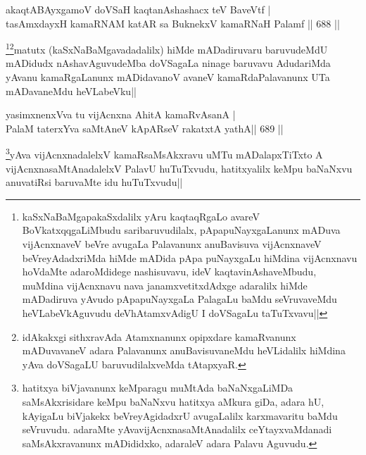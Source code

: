 
\begin{shl}
akaqtABAyxgamoV doVSaH kaqtanAshashacx teV BaveVtf | \\
tasAmxdayxH kamaRNAM katAR sa BuknekxV kamaRNaH Palamf \hfill||  688 ||  
\end{shl}

\begin{artha}
\footnote{kaSxNaBaMgapakaSxdalilx yAru kaqtaqRgaLo avareV BoVkatxqqgaLiMbudu saribaruvudilalx, pApapuNayxgaLanunx mADuva vijAcnxnaveV beVre avugaLa Palavanunx anuBavisuva vijAcnxnaveV beVreyAdadxriMda hiMde mADida pApa puNayxgaLu hiMdina vijAcnxnavu hoVdaMte adaroMdidege nashisuvavu, ideV kaqtavinAshaveMbudu, muMdina vijAcnxnavu nava janamxvetitxdAdxge adaralilx hiMde mADadiruva yAvudo pApapuNayxgaLa PalagaLu baMdu seVruvaveMdu heVLabeVkAguvudu deVhAtamxvAdigU I doVSagaLu taTuTxvavu||}\footnote{idAkakxgi sithxravAda Atamxnanunx opipxdare kamaRvanunx mADuvavaneV adara Palavanunx anuBavisuvaneMdu heVLidalilx hiMdina yAva doVSagaLU baruvudilalxveMda tAtapxyaR.}matutx (kaSxNaBaMgavadadalilx) hiMde mADadiruvaru baruvudeMdU mADidudx nAshavAguvudeMba doVSagaLa ninage baruvavu AdudariMda yAvanu kamaRgaLanunx mADidavanoV avaneV kamaRdaPalavanunx UTa mADavaneMdu heVLabeVku||
\end{artha}



\begin{shl}
yasimxnenxVva tu vijAcnxna AhitA kamaRvAsanA | \\
PalaM taterxYva saMtAneV kApARseV rakatxtA yathA\hfill ||  689 ||  
\end{shl}

\begin{artha}
\footnote{hatitxya biVjavanunx keMparagu muMtAda baNaNxgaLiMDa saMsAkxrisidare keMpu baNaNxvu  hatitxya aMkura giDa, adara hU, kAyigaLu biVjakekx beVreyAgidadxrU avugaLalilx karxmavaritu baMdu seVruvudu. adaraMte yAvavijAcnxnasaMtAnadalilx ceYtayxvaMdanadi saMsAkxravanunx mADididxko, adaraleV adara Palavu Aguvudu.}yAva vijAcnxnadalelxV kamaRsaMsAkxravu uMTu mADalapxTiTxto A vijAcnxnasaMtAnadalelxV PalavU huTuTxvudu, hatitxyalilx keMpu baNaNxvu anuvatiRsi baruvaMte idu huTuTxvudu||
\end{artha}


